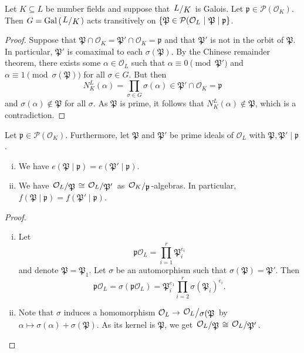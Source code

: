 \begin{lema}
Let $K \subseteq L$ be number fields and suppose that $\kvoc{L}{K}$
is Galois. Let $\mathfrak{p} \in \mathcal{P}(\mathcal{O}_K)$. Then
$G = \Gal \br{\kvoc{L}{K}}$ acts transitively on
$\left\{\mathfrak{P} \in \mathcal{P}(\mathcal{O}_L~\middle\vert~\mathfrak{P} \mid \mathfrak{p}\right\}$.
\end{lema}

\begin{proof}
Suppose that
$\mathfrak{P} \cap \mathcal{O}_K =
\mathfrak{P}' \cap \mathcal{O}_K =
\mathfrak{p}$ and that $\mathfrak{P}'$ is not in the orbit of
$\mathfrak{P}$. In particular, $\mathfrak{P}'$ is comaximal to each
$\sigma(\mathfrak{P})$. By the Chinese remainder theorem, there
exists some $\alpha \in \mathcal{O}_L$ such that
$\alpha \equiv 0 \pmod{\mathfrak{P}'}$ and
$\alpha \equiv 1 \pmod{\sigma(\mathfrak{P})}$ for all
$\sigma \in G$. But then
\[
N_K^L(\alpha) = \prod_{\sigma \in G} \sigma(\alpha) \in
\mathfrak{P}' \cap \mathcal{O}_K =
\mathfrak{p}
\]
and $\sigma(\alpha) \not \in \mathfrak{P}$ for all $\sigma$. As
$\mathfrak{P}$ is prime, it follows that
$N_K^L(\alpha) \not \in \mathfrak{P}$, which is a contradiction.
\end{proof}

\begin{trditev}
Let $\mathfrak{p} \in \mathcal{P}(\mathcal{O}_K)$. Furthermore, let
$\mathfrak{P}$ and $\mathfrak{P'}$ be prime ideals of
$\mathcal{O}_L$ with
$\mathfrak{P}, \mathfrak{P}' \mid \mathfrak{p}$.

\begin{enumerate}[i)]
\item We have
$e(\mathfrak{P} \mid \mathfrak{p}) =
e(\mathfrak{P}' \mid \mathfrak{p})$.
\item We have
$\kvoc{\mathcal{O}_L}{\mathfrak{P}} \cong
\kvoc{\mathcal{O}_L}{\mathfrak{P}'}$ as
$\kvoc{\mathcal{O}_K}{\mathfrak{p}}$-algebras. In particular,
$f(\mathfrak{P} \mid \mathfrak{p}) =
f(\mathfrak{P}' \mid \mathfrak{p})$.
\end{enumerate}
\end{trditev}

\pagebreak

\begin{proof}
\phantom{i}
\begin{enumerate}[i)]
\item Let
\[
\mathfrak{p} \mathcal{O}_L = \prod_{i=1}^r \mathfrak{P}_i^{e_i}
\]
and denote $\mathfrak{P} = \mathfrak{P}_1$. Let $\sigma$ be an
automorphism such that $\sigma(\mathfrak{P}) = \mathfrak{P}'$. Then
\[
\mathfrak{p} \mathcal{O}_L =
\sigma(\mathfrak{p} \mathcal{O}_L) =
\mathfrak{P}_i^{e_1} \prod_{i=2}^r \sigma(\mathfrak{P}_i)^{e_i}.
\]
\item Note that $\sigma$ induces a homomorphism
$\mathcal{O}_L \to \kvoc{\mathcal{O}_L}{\sigma(\mathfrak{P}}$ by
$\alpha \mapsto \sigma(\alpha) + \sigma(\mathfrak{P})$. As its
kernel is $\mathfrak{P}$, we get
$\kvoc{\mathcal{O}_L}{\mathfrak{P}} \cong
\kvoc{\mathcal{O}_L}{\mathfrak{P}'}$.  \qedhere
\end{enumerate}
\end{proof}

